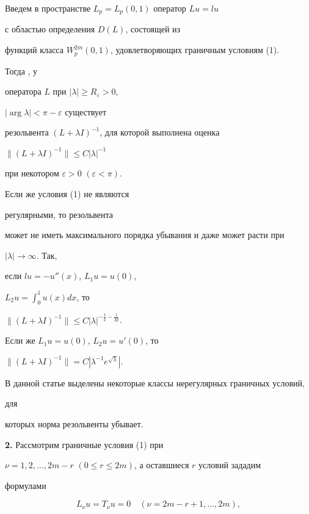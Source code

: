  


Введем в пространстве $L_p=L_p(0,1)$ оператор $Lu=lu$ 


с областью определения $D(L)$, состоящей из 


функций класса $W_p^{2m}(0,1)$, удовлетворяющих граничным условиям (1). 


Тогда \cite{Yak}, \cite{Nai} у 


оператора $L$ при $|\lambda|\ge R_\varepsilon>0$, 


$|\arg\lambda|<\pi-\varepsilon$ существует 


резольвента $(L+\lambda I)^{-1}$, для которой выполнена оценка 


$\|(L+\lambda I)^{-1}\|\le C|\lambda|^{-1}$ 


при некотором $\varepsilon>0$ $(\varepsilon<\pi)$. 


Если же условия (1) не являются 


регулярными, то резольвента 


может не иметь максимального порядка убывания и даже может расти при 


$|\lambda|\to \infty$. Так, 


если $lu=-u''(x)$, $L_1u=u(0)$, 


$L_2u=\int^1_0u(x)dx$, то 


$\|(L+\lambda I)^{-1}\|\le C|\lambda|^{-\frac{1}{2}-\frac{1}{2p}}$. 


Если же $L_1u=u(0)$, $L_2u=u'(0)$, то 


$\|(L+\lambda I)^{-1}\|=C|\lambda^{-1}e^{\sqrt\lambda}|$. 


 


В данной статье выделены некоторые классы нерегулярных граничных условий, 


для 


которых норма резольвенты убывает. 


 


{\bf 2.} Рассмотрим граничные условия (1) при 


$\nu=1,2,\dotsc,2m-r$ $(0\le r\le 2m)$, а оставшиеся $r$ условий зададим 


формулами 


\begin{equation} 


L_\nu u=T_\nu u=0 \quad (\nu=2m-r+1,\dotsc,2m), 


\end{equation} 


